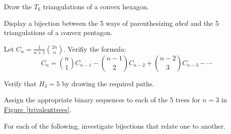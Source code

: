 \documentclass[10pt,]{book}
\theoremstyle{plain}
\theoremstyle{definition}
\theoremstyle{definition}
\theoremstyle{definition}
\theoremstyle{definition}
\numberwithin{equation}{chapter}
\begin{document}
\begin{divisionexercise}{8}\hypertarget{exercise-58}{}
\hypertarget{p-817}{}%
Draw the \(T_{6}\) triangulations of a convex hexagon.%
\end{divisionexercise}%
\begin{divisionexercise}{9}\hypertarget{exercise-59}{}
\hypertarget{p-818}{}%
Display a bijection between the 5 ways of parenthesizing \(abcd\) and the 5 triangulations of a convex pentagon.%
\end{divisionexercise}%
\begin{divisionexercise}{10}\hypertarget{exercise-60}{}
\hypertarget{p-819}{}%
Let \(C_{n} = \frac{1}{n + 1}\binom{2n}{n}.\) Verifiy the formula:%
\begin{equation*}
C_{n} = \binom{n}{1} C_{n - 1} - \binom{n - 1}{2} C_{n - 2} + \binom{n - 2}{3} C_{n - 3} - \cdots
\end{equation*}
%
\end{divisionexercise}%
\begin{divisionexercise}{11}\hypertarget{exercise-61}{}
\hypertarget{p-820}{}%
Verify that \(H_{3} = 5\) by drawing the required paths.%
\end{divisionexercise}%
\begin{divisionexercise}{12}\hypertarget{exercise-62}{}
\hypertarget{p-821}{}%
Assign the appropriate binary sequences to each of the 5 trees for \(n=3\) in \hyperref[trivalenttrees]{Figure~\ref{trivalenttrees}}.%
\end{divisionexercise}%
\hypertarget{exercisegroup-1}{}
\par\noindent \hypertarget{p-822}{}%
For each of the following, investigate bijections that relate one to another.%
\end{document}

